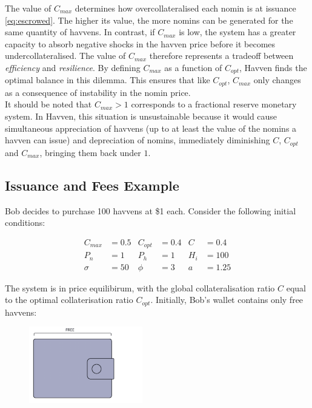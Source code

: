 \noindent The value of $C_{max}$ determines how overcollateralised each nomin is at issuance \eqref{eq:escrowed}. The higher its value, the more nomins can be generated for the same quantity of havvens. In contrast, if $C_{max}$ is low, the system has a greater capacity to absorb negative shocks in the havven price before it becomes undercollateralised.  The value of $C_{max}$ therefore represents a tradeoff between \textit{efficiency} and \textit{resilience}. By defining $C_{max}$ as a function of $C_{opt}$, Havven finds the optimal balance in this dilemma. This ensures that like $C_{opt}$, $C_{max}$ only changes as a consequence of instability in the nomin price. \\

\noindent It should be noted that $C_{max} > 1$ corresponds to a fractional reserve monetary system. In Havven, this situation is unsustainable because it would cause simultaneous appreciation of havvens (up to at least the value of the nomins a havven can issue) and depreciation of nomins, immediately diminishing $C$, $C_{opt}$ and $C_{max}$, bringing them back under $1$.

\subsection{Issuance and Fees Example} 

\noindent Bob decides to purchase 100 havvens at \$1 each. Consider the following initial conditions:

\begin{align*}
C_{max} &= 0.5 & C_{opt} &= 0.4 & C &= 0.4 \\
P_n &= 1 & P_h &= 1 & H_i &= 100 \\
\sigma &= 50 & \phi &= 3 & a&= 1.25
\end{align*}

\noindent The system is in price equilibirum, with the global collateralisation ratio $C$ equal to the optimal collaterisation ratio $C_{opt}$. Initially,  Bob's wallet contains only free havvens:

\begin{figure}[h!]
\centering
     \includegraphics[width=0.44\textwidth]{img/wallet_new}
\end{figure}

